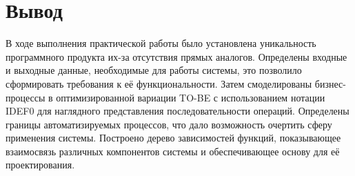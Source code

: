 \clearpage

\section*{\LARGE Вывод}

В ходе выполнения практической работы было установлена
уникальность программного продукта их-за отсутствия прямых аналогов.
Определены входные и выходные данные, необходимые для работы системы,
это позволило сформировать требования к её функциональности.
Затем смоделированы бизнес-процессы в оптимизированной вариации TO-BE
с использованием нотации IDEF0
для наглядного представления последовательности операций.
Определены границы автоматизируемых процессов,
что дало возможность очертить сферу применения системы.
Построено дерево зависимостей функций,
показывающее взаимосвязь различных компонентов системы
и обеспечивающее основу для её проектирования.


